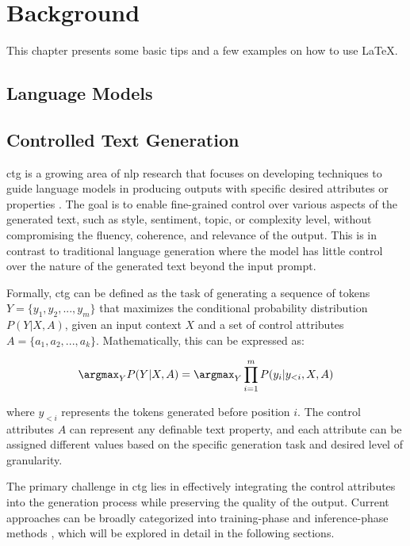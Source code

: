 \chapter{Background}
\label{c2}

This chapter presents some basic tips and a few examples on how to use \LaTeX.


\section{Language Models}
\label{c2:s:language-models}



\section{Controlled Text Generation}
\label{c2:s:controlled-text-generation}

\gls{ctg} is a growing area of \gls{nlp} research that focuses on developing techniques to guide language models in producing outputs with specific desired attributes or properties \cite{liang2024controllabletextgenerationlarge, 10.1145/3617680, keskar2019ctrlconditionaltransformerlanguage, dathathri2020plugplaylanguagemodels}.
The goal is to enable fine-grained control over various aspects of the generated text, such as style, sentiment, topic, or complexity level, without compromising the fluency, coherence, and relevance of the output. 
This is in contrast to traditional language generation where the model has little control over the nature of the generated text beyond the input prompt.

Formally, \gls{ctg} can be defined as the task of generating a sequence of tokens $Y = \{y_1, y_2, ..., y_m\}$ that maximizes the conditional probability distribution $P(Y|X, A)$, given an input context $X$ and a set of control attributes $A = \{a_1, a_2, ..., a_k\}$. 
Mathematically, this can be expressed as:

\begin{equation}
    \label{eq:controlled-generation}
    \argmax_Y P(Y | X, A) = \argmax_Y \prod_{i = 1}^{m} P(y_i | y_{<i}, X, A)
\end{equation}

where $y_{<i}$ represents the tokens generated before position $i$. 
The control attributes $A$ can represent any definable text property, and each attribute can be assigned different values based on the specific generation task and desired level of granularity.

The primary challenge in \gls{ctg} lies in effectively integrating the control attributes into the generation process while preserving the quality of the output. 
Current approaches can be broadly categorized into training-phase and inference-phase methods \cite{liang2024controllabletextgenerationlarge, he-etal-2022-ctrlsum}, which will be explored in detail in the following sections.

